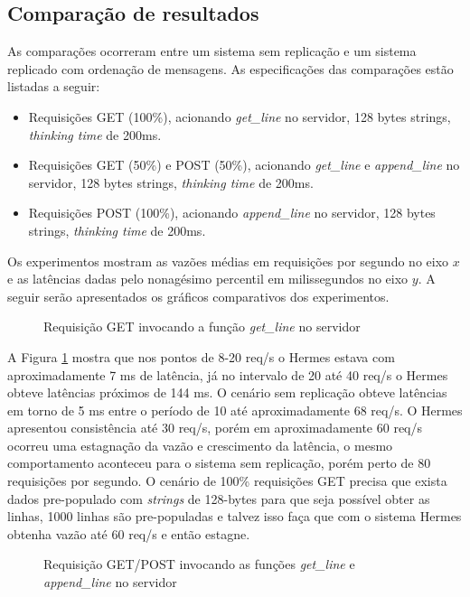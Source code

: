 \subsection{Comparação de resultados}

As comparações ocorreram entre um sistema sem replicação e um sistema replicado com ordenação de mensagens. As especificações das comparações estão listadas a seguir:

\begin{itemize}
\item Requisições GET (100\%), acionando \textit{get\_line} no servidor, 128 bytes strings, \textit{thinking time} de 200ms.
\item Requisições GET (50\%) e POST (50\%), acionando \textit{get\_line} e \textit{append\_line} no servidor, 128 bytes strings, \textit{thinking time} de 200ms.
\item Requisições POST (100\%), acionando \textit{append\_line} no servidor, 128 bytes strings, \textit{thinking time} de 200ms.
\end{itemize}

Os experimentos mostram as vazões médias em requisições por segundo no eixo $x$ e as latências dadas pelo nonagésimo percentil em milissegundos no eixo $y$. A seguir serão apresentados os gráficos comparativos dos experimentos.

\begin{figure}[htb!]
\centering
\caption{Requisição GET invocando a função \textit{get\_line} no servidor}

\label{fig:get-line}
\end{figure}

A Figura \ref{fig:get-line} mostra que nos pontos de 8-20 req/s o Hermes estava com aproximadamente 7 ms de latência, já no intervalo de 20 até 40 req/s o Hermes obteve latências próximos de 144 ms. O cenário sem replicação obteve latências em torno de 5 ms entre o período de 10 até aproximadamente 68 req/s. O Hermes apresentou consistência até 30 req/s, porém em aproximadamente 60 req/s ocorreu uma estagnação da vazão e crescimento da latência, o mesmo comportamento aconteceu para o sistema sem replicação, porém perto de 80 requisições por segundo. O cenário de 100\% requisições GET precisa que exista dados pre-populado com \textit{strings} de 128-bytes para que seja possível obter as linhas, 1000 linhas são pre-populadas e talvez isso faça que com o sistema Hermes obtenha vazão até 60 req/s e então estagne.

\begin{figure}[htb!]
\centering
\caption{Requisição GET/POST invocando as funções \textit{get\_line} e \textit{append\_line} no servidor}

\label{fig:get-append-line}
\end{figure}

